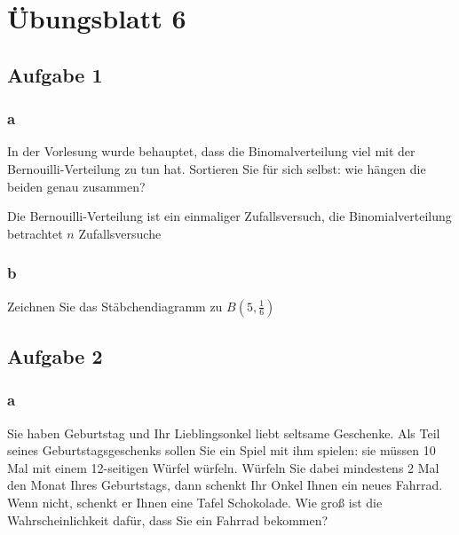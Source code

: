 \chapter{Übungsblatt 6}

\section{Aufgabe 1}

\subsection{a}
In der Vorlesung wurde behauptet, dass die Binomalverteilung viel mit der Bernouilli-Verteilung zu tun hat. Sortieren Sie für sich selbst: wie hängen die beiden genau zusammen?

Die Bernouilli-Verteilung ist ein einmaliger Zufallsversuch, die Bino\-mial\-verteilung betrachtet $n$ Zufallsversuche

\subsection{b}
Zeichnen Sie das Stäbchendiagramm zu $B(5,\frac{1}{6})$


\section{Aufgabe 2}

\subsection{a}

Sie haben Geburtstag und Ihr Lieblingsonkel liebt seltsame Geschenke. Als Teil seines Geburtstagsgeschenks sollen Sie ein Spiel mit ihm spielen: sie müssen 10 Mal mit einem 12-seitigen Würfel würfeln. Würfeln Sie dabei mindestens 2 Mal den Monat Ihres Geburtstags, dann schenkt Ihr Onkel Ihnen ein neues Fahrrad. Wenn nicht, schenkt er Ihnen eine Tafel Schokolade. Wie groß ist die Wahrscheinlichkeit dafür, dass Sie ein Fahrrad bekommen?

